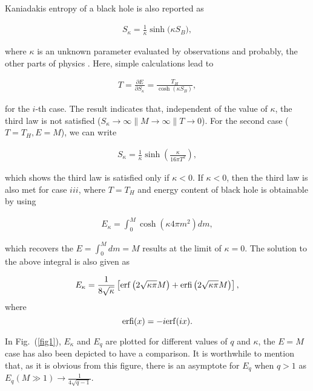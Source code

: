 \documentclass[twocolumn,preprintnumbers,amsmath,nofootinbib,amssymb]{revtex4}
\begin{document}
Kaniadakis entropy of a black hole is also reported as \cite{KHDE}

\begin{eqnarray}\label{K1}
S_\kappa=\frac{1}{\kappa}\sinh\big(\kappa S_{B}\big),
\end{eqnarray}

\noindent where $\kappa$ is an unknown parameter evaluated by
observations and probably, the other parts of physics \cite{KHDE}.
Here, simple calculations lead to

\begin{eqnarray}\label{K2}
T=\frac{\partial E}{\partial S_\kappa}=\frac{T_H}{\cosh(\kappa S_B)},
\end{eqnarray}

\noindent for the $i$-th case. The result indicates that,
independent of the value of $\kappa$, the third law is not
satisfied ($S_\kappa\rightarrow\infty\parallel
M\rightarrow\infty\parallel T\rightarrow0$). For the second case
($T=T_H, E=M$), we can write

\begin{eqnarray}\label{K3}
S_\kappa=\frac{1}{\kappa}\sinh\left(\frac{\kappa}{16\pi T^2}\right),
\end{eqnarray}

\noindent which shows the third law is satisfied only if
$\kappa<0$. If $\kappa<0$, then the third law is also met for case
$iii$, where $T=T_H$ and energy content of black hole is
obtainable by using

\begin{eqnarray}\label{K4}
E_\kappa=\int_0^M\cosh(\kappa4\pi m^2)dm,
\end{eqnarray}

\noindent which recovers the $E=\int_0^Mdm=M$ results at the limit
of $\kappa=0$. The solution to the above integral is also given as

\begin{eqnarray}\label{K5}
E_\kappa=\frac{1}{8\sqrt{\kappa}}\left[{\rm erf}\left(2\sqrt{\kappa\pi}M\right)+{\rm erfi}\left(2\sqrt{\kappa\pi}M\right)\right],
\end{eqnarray}
where
\begin{equation}
{\rm erfi}(x)=-i{\rm erf}(ix).
\end{equation}

In Fig.~(\ref{fig1}), $E_\kappa$ and $E_q$ are plotted for
different values of $q$ and $\kappa$, the $E=M$ case has also been
depicted to have a comparison. It is worthwhile to mention that,
as it is obvious from this figure, there is an asymptote for $E_q$
when $q>1$ as $E_q(M\gg1)\rightarrow\frac{1}{4\sqrt{q-1}}$.
\end{document}
